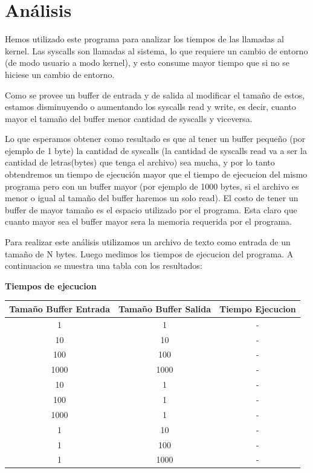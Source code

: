 \documentclass[11pt,a4paper]{article}
\begin{document}
\section{Análisis}
Hemos utilizado este programa para analizar los tiempos de las llamadas al kernel. Las syscalls son llamadas al sistema, lo que requiere un cambio de entorno (de modo usuario a modo kernel), y esto consume mayor tiempo que si no se hiciese un cambio de entorno.

Como se provee un buffer de entrada y de salida al modificar el tamaño de estos, estamos disminuyendo o aumentando los syscalls read y write, es decir, cuanto mayor el tamaño del buffer menor cantidad de syscalls y viceversa.

Lo que esperamos obtener como resultado es que al tener un buffer pequeño (por ejemplo de 1 byte) la cantidad de syscalls (la cantidad de syscalls read va a ser la cantidad de letras(bytes) que tenga el archivo) sea mucha, y por lo tanto obtendremos un tiempo de ejecución mayor que el tiempo de ejecucion del mismo programa pero con un buffer mayor (por ejemplo de 1000 bytes, si el archivo es menor o igual al tamaño del buffer haremos un solo read).
El costo de tener un buffer de mayor tamaño es el espacio utilizado por el programa. Esta claro que cuanto mayor sea el buffer mayor sera la memoria requerida por el programa.

Para realizar este análisis utilizamos un archivo de texto como entrada de un tamaño de N bytes. Luego medimos los tiempos de ejecucion del programa. A continuacion se muestra una tabla con los resultados:

\begin{table}[h]
	\centering
	\textbf{Tiempos de ejecucion}\\
	\begin{tabular}{|c|c|c|}
		\hline
		Tamaño Buffer Entrada & Tamaño Buffer Salida & Tiempo Ejecucion \\
		\hline
		1 & 1 & - \\
		\hline
		10 & 10 & - \\
		\hline
		100 & 100 & - \\
		\hline
		1000 & 1000 & - \\
		\hline
		10 & 1 & - \\
		\hline
		100 & 1 & - \\
		\hline
		1000 & 1 & - \\
		\hline
		1 & 10 & - \\
		\hline
		1 & 100 & - \\
		\hline
		1 & 1000 & - \\
		\hline
	\end{tabular}
\end{table}
\end{document}

